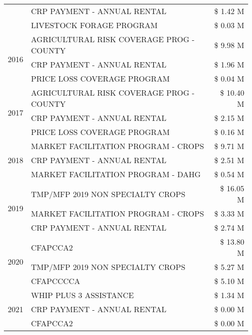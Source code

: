 \begin{tabular}{llr}
 & CRP PAYMENT - ANNUAL RENTAL & \$ 1.42 M \\
 & LIVESTOCK FORAGE PROGRAM & \$ 0.03 M \\
\cline{1-3}
\multirow[t]{3}{*}{2016} & AGRICULTURAL RISK COVERAGE PROG - COUNTY & \$ 9.98 M \\
 & CRP PAYMENT - ANNUAL RENTAL & \$ 1.96 M \\
 & PRICE LOSS COVERAGE PROGRAM & \$ 0.04 M \\
\cline{1-3}
\multirow[t]{3}{*}{2017} & AGRICULTURAL RISK COVERAGE PROG - COUNTY & \$ 10.40 M \\
 & CRP PAYMENT - ANNUAL RENTAL & \$ 2.15 M \\
 & PRICE LOSS COVERAGE PROGRAM & \$ 0.16 M \\
\cline{1-3}
\multirow[t]{3}{*}{2018} & MARKET FACILITATION PROGRAM - CROPS & \$ 9.71 M \\
 & CRP PAYMENT - ANNUAL RENTAL & \$ 2.51 M \\
 & MARKET FACILITATION PROGRAM - DAHG & \$ 0.54 M \\
\cline{1-3}
\multirow[t]{3}{*}{2019} & TMP/MFP 2019 NON SPECIALTY CROPS & \$ 16.05 M \\
 & MARKET FACILITATION PROGRAM - CROPS & \$ 3.33 M \\
 & CRP PAYMENT - ANNUAL RENTAL & \$ 2.74 M \\
\cline{1-3}
\multirow[t]{3}{*}{2020} & CFAPCCA2 & \$ 13.80 M \\
 & TMP/MFP 2019 NON SPECIALTY CROPS & \$ 5.27 M \\
 & CFAPCCCCA & \$ 5.10 M \\
\cline{1-3}
\multirow[t]{3}{*}{2021} & WHIP PLUS 3 ASSISTANCE & \$ 1.34 M \\
 & CRP PAYMENT - ANNUAL RENTAL & \$ 0.00 M \\
 & CFAPCCA2 & \$ 0.00 M \\
\cline{1-3}
\bottomrule
\end{tabular}
